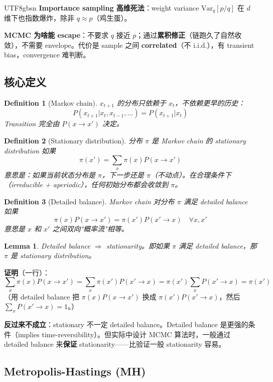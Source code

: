 \documentclass[11pt]{article}
\newtheorem{definition}{Definition}[section]
\newtheorem{lemma}{Lemma}[section]
\begin{document}
\begin{CJK}{UTF8}{gbsn}
\textbf{Importance sampling 高维死法}：weight variance $\text{Var}_q[p/q]$ 在 $d$ 维下也指数爆炸，除非 $q \approx p$（鸡生蛋）。

\textbf{MCMC 为啥能 escape}：不要求 $q$ 接近 $p$；通过\textbf{累积修正}（链跑久了自然收敛），不需要 envelope。代价是 sample 之间 \textbf{correlated}（不 i.i.d.），有 transient bias，convergence 难判断。

\subsection{核心定义}

\begin{definition}[Markov chain]
$x_{t+1}$ 的分布只依赖于 $x_t$，不依赖更早的历史：
\[
P(x_{t+1} | x_t, x_{t-1}, \ldots) = P(x_{t+1} | x_t)
\]
Transition 完全由 $P(x \to x')$ 决定。
\end{definition}

\begin{definition}[Stationary distribution]
分布 $\pi$ 是 Markov chain 的 stationary distribution 如果
\[
\pi(x') = \sum_x \pi(x) P(x \to x')
\]
意思是：如果当前状态分布是 $\pi$，下一步还是 $\pi$（不动点）。在合理条件下（irreducible + aperiodic），任何初始分布都会收敛到 $\pi$。
\end{definition}

\begin{definition}[Detailed balance]
Markov chain 对分布 $\pi$ 满足 detailed balance 如果
\[
\pi(x) P(x \to x') = \pi(x') P(x' \to x) \quad \forall x, x'
\]
意思是 $x$ 和 $x'$ 之间双向"概率流"相等。
\end{definition}

\begin{lemma}
Detailed balance $\Rightarrow$ stationarity。即如果 $\pi$ 满足 detailed balance，那 $\pi$ 是 stationary distribution。
\end{lemma}

\textbf{证明}（一行）：
\[
\sum_x \pi(x) P(x \to x') = \sum_x \pi(x') P(x' \to x) = \pi(x') \sum_x P(x' \to x) = \pi(x')
\]
（用 detailed balance 把 $\pi(x) P(x \to x')$ 换成 $\pi(x') P(x' \to x)$，然后 $\sum_x P(x' \to x) = 1$。）

\textbf{反过来不成立}：stationary 不一定 detailed balance。Detailed balance 是更强的条件（implies time-reversibility）。但实际中设计 MCMC 算法时，一般通过 detailed balance 来\textbf{保证} stationarity——比验证一般 stationarity 容易。

\subsection{Metropolis-Hastings (MH)}


\end{CJK}
\end{document}
